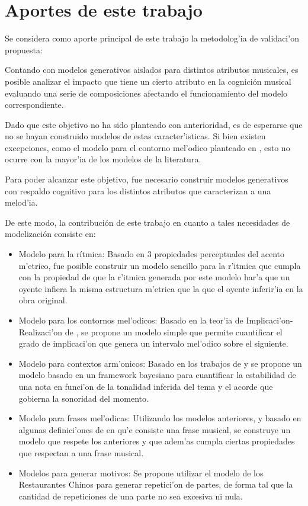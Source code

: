 \section{Aportes de este trabajo}
Se considera como aporte principal de este trabajo la metodolog'ia de validaci'on propuesta: 

Contando con modelos generativos aislados para distintos atributos musicales, es posible analizar el impacto que tiene un cierto 
atributo en la cognici\'on musical
evaluando una serie de composiciones afectando el funcionamiento del modelo correspondiente.


Dado que este objetivo no ha sido planteado con anterioridad, es de esperarse que no se hayan construido modelos de estas caracter'isticas. Si bien existen excepciones, 
como el modelo para el contorno mel'odico planteado en \cite{PaieThesis}, esto no ocurre con la mayor'ia de los modelos de la literatura. 

Para poder alcanzar este objetivo, fue necesario construir modelos ge\-nerativos con respaldo cognitivo para los distintos atributos que caracterizan a una melod'ia.

De este modo, la contribución de este trabajo en cuanto a tales necesidades de modelización consiste en:

\begin{itemize}
 \item Modelo para la r\'itmica: Basado en 3 propiedades perceptuales del acento m'etrico, fue posible construir un modelo sencillo para la r'itmica
 que cumpla con la propiedad de que la r'itmica generada por este modelo har'a que un oyente infiera la misma estructura m'etrica que la que el oyente inferir'ia 
 en la obra original.

 \item Modelo para los contornos mel'odicos: Basado en la teor'ia de Implicaci'on-Realizaci'on de \cite{Narmour91}, se propone un modelo simple que permite cuantificar 
 el grado de implicaci'on que genera un intervalo mel'odico sobre el siguiente.

 \item Modelo para contextos arm'onicos: Basado en los trabajos de \cite{Krumhansl90} y \cite{Lerdahl2001} se propone un modelo basado en un framework bayesiano
 para cuantificar la estabilidad de una nota en funci'on de la tonalidad inferida del tema y el acorde que gobierna la sonoridad del momento.

 \item Modelo para frases mel'odicas: Utilizando los modelos anteriores, y basado en algunas definici'ones de en qu'e consiste una frase musical, se construye un modelo
 que respete los anteriores y que adem'as cumpla ciertas propiedades que respectan a una frase musical.

 \item Modelos para generar motivos: Se propone utilizar el modelo de los Restaurantes Chinos \citep{Teh2007} para generar repetici'on de partes, 
 de forma tal que la cantidad de repeticiones de una parte no sea excesiva ni nula.

\end{itemize}

